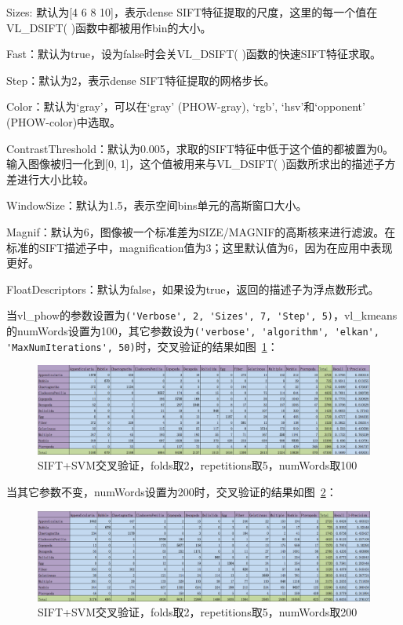\documentclass[12pt]{article}
\begin{document}
\begin{enumerate}
\begin{itemize}
Sizes: 默认为[4 6 8 10]，表示dense SIFT特征提取的尺度，这里的每一个值在VL\_DSIFT( )函数中都被用作bin的大小。

Fast：默认为true，设为false时会关VL\_DSIFT( )函数的快速SIFT特征求取。

Step：默认为2，表示dense SIFT特征提取的网格步长。

Color：默认为`gray'，可以在`gray' (PHOW-gray), `rgb', `hsv'和`opponent' (PHOW-color)中选取。

ContrastThreshold：默认为0.005，求取的SIFT特征中低于这个值的都被置为0。输入图像被归一化到[0, 1]，这个值被用来与VL\_DSIFT( )函数所求出的描述子方差进行大小比较。

WindowSize：默认为1.5，表示空间bins单元的高斯窗口大小。

Magnif：默认为6，图像被一个标准差为SIZE/MAGNIF的高斯核来进行滤波。在标准的SIFT描述子中，magnification值为3；这里默认值为6，因为在应用中表现更好。

FloatDescriptors：默认为false，如果设为true，返回的描述子为浮点数形式。

当vl\_phow的参数设置为\verb|('Verbose', 2, 'Sizes', 7, 'Step', 5)|，vl\_kmeans的numWords设置为100，其它参数设为\verb|('verbose', 'algorithm', 'elkan', 'MaxNumIterations', 50)|时，交叉验证的结果如图~\ref{fig: SIFT-SVM-2-folds-5-repetitions-100}：

\begin{figure}[!ht]
\centering
\includegraphics[width=1.0\linewidth]{SIFT-SVM-2-folds-5-repetitions-100}
\caption{SIFT+SVM交叉验证，folds取2，repetitions取5，numWords取100}
\label{fig: SIFT-SVM-2-folds-5-repetitions-100}
\end{figure}

当其它参数不变，numWords设置为200时，交叉验证的结果如图~\ref{fig: SIFT-SVM-2-folds-5-repetitions-200}：

\begin{figure}[!ht]
\centering
\includegraphics[width=1.0\linewidth]{SIFT-SVM-2-folds-5-repetitions-200}
\caption{SIFT+SVM交叉验证，folds取2，repetitions取5，numWords取200}
\label{fig: SIFT-SVM-2-folds-5-repetitions-200}
\end{figure}


\end{itemize}
\end{enumerate}
\end{document}
